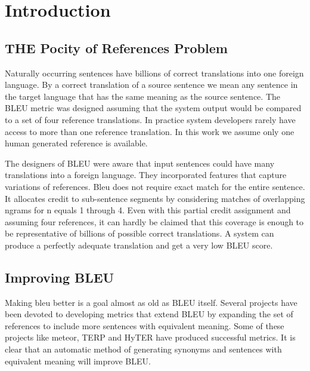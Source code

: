 \section{Introduction}
\label{sec:intro}


\subsection{THE Pocity of References Problem}
\label{sec:pocityprob}

Naturally occurring sentences have billions of correct translations into one foreign language\cite{dreyer-marcu:2012:NAACL-HLT}. 
By a correct translation of a source sentence we mean any sentence in the target language that has the same meaning as the source sentence. 
The BLEU\cite{papineni-02} metric was designed assuming that the system output would be compared to a set of four reference translations. 
In practice system developers rarely have access to more than one  reference translation. 
In this work we assume only one human generated reference is available. 

The designers of BLEU were aware that input sentences could have many translations into a foreign language. 
They incorporated features that capture variations of references. 
Bleu does not require exact match for the entire sentence. 
It allocates credit to sub-sentence segments by considering matches  of overlapping ngrams for   n equals 1 through 4.
Even with this partial credit assignment and assuming four references, it can hardly be claimed that this coverage is enough to be representative of billions of possible correct translations. 
A system can produce a perfectly adequate translation and get a very low BLEU score. 

\subsection{Improving BLEU}
\label{sec:improvebleu}

Making bleu better is a goal almost as old as BLEU itself. 
Several projects have been devoted to developing metrics that extend BLEU by expanding the set of references to include more sentences with equivalent meaning. 
Some of these projects like meteor\cite{banerjee-lavie:2005:MTSumm}\cite{denkowski:lavie:meteor-wmt:2014}, TERP\cite{snover-06}\cite{snover-08} and HyTER have produced successful metrics. 
It is clear that an automatic method of generating synonyms and sentences with equivalent meaning will improve  BLEU. 


